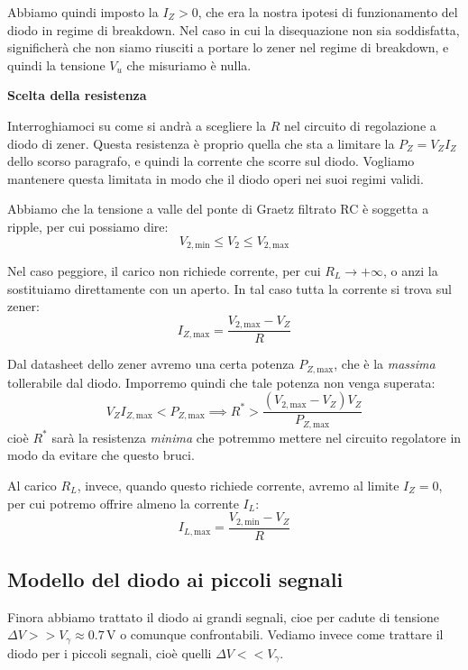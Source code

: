 \documentclass[a4paper,11pt]{article}
\begin{document}
Abbiamo quindi imposto la $I_Z > 0$, che era la nostra ipotesi di funzionamento del diodo in regime di breakdown. Nel caso in cui la disequazione non sia soddisfatta, significherà che non siamo riusciti a portare lo zener nel regime di breakdown, e quindi la tensione $V_u$ che misuriamo è nulla.

\par\smallskip

\noindent
\textbf{\textsf{Scelta della resistenza}}

\noindent
Interroghiamoci su come si andrà a scegliere la $R$ nel circuito di regolazione a diodo di zener. Questa resistenza è proprio quella che sta a limitare la $P_Z = V_Z I_Z$ dello scorso paragrafo, e quindi la corrente che scorre sul diodo. Vogliamo mantenere questa limitata in modo che il diodo operi nei suoi regimi validi.

Abbiamo che la tensione a valle del ponte di Graetz filtrato RC è soggetta a ripple, per cui possiamo dire:
$$
V_{2,\mathrm{min}} \leq V_2 \leq V_{2,\mathrm{max}}
$$

Nel caso peggiore, il carico non richiede corrente, per cui $R_L \rightarrow +\infty$, o anzi la sostituiamo direttamente con un aperto. In tal caso tutta la corrente si trova sul zener:
$$
I_{Z,\mathrm{max}} = \frac{V_{2,\mathrm{max}} - V_Z}{R} 
$$

Dal datasheet dello zener avremo una certa potenza $P_{Z,\mathrm{max}}$, che è la \textit{massima} tollerabile dal diodo. Imporremo quindi che tale potenza non venga superata:
$$
V_Z I_{Z,\mathrm{max}} < P_{Z,\mathrm{max}} \implies R^* > \frac{(V_{2,\mathrm{max}} - V_Z) V_Z}{P_{Z,\mathrm{max}}} 
$$
cioè $R^*$ sarà la resistenza \textit{minima} che potremmo mettere nel circuito regolatore in modo da evitare che questo bruci. 

Al carico $R_L$, invece, quando questo richiede corrente, avremo al limite $I_Z = 0$, per cui potremo offrire almeno la corrente $I_L$:
$$
I_{L,\mathrm{max}} = \frac{V_{2,\mathrm{min}} - V_Z}{R}
$$

\subsection{Modello del diodo ai piccoli segnali}
Finora abbiamo trattato il diodo ai grandi segnali, cioe per cadute di tensione $\Delta V >> V_\gamma \approx 0.7 \, \mathrm{V}$ o comunque confrontabili. Vediamo invece come trattare il diodo per i piccoli segnali, cioè quelli $\Delta V << V_\gamma$.
\end{document}
